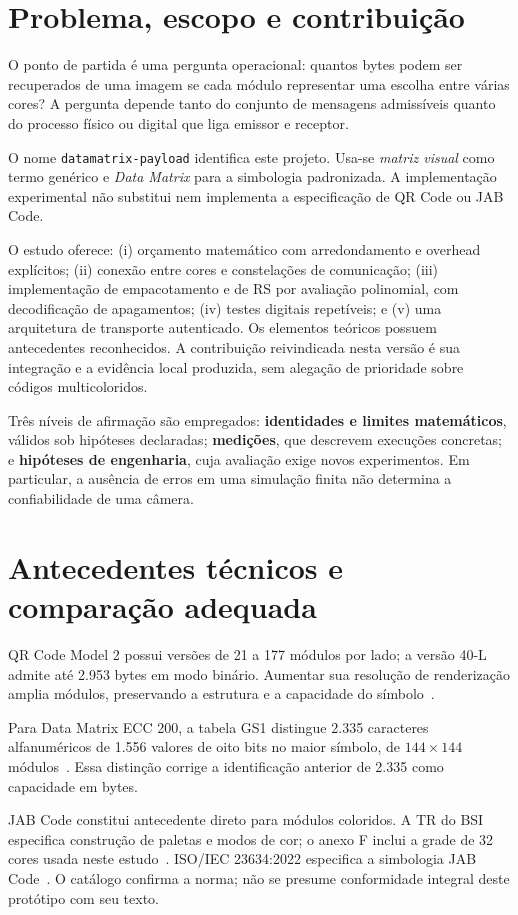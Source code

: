 \documentclass[11pt,a4paper]{article}
\begin{document}
\section{Problema, escopo e contribuição}
O ponto de partida é uma pergunta operacional: quantos bytes podem ser recuperados de uma imagem se cada módulo representar uma escolha entre várias cores? A pergunta depende tanto do conjunto de mensagens admissíveis quanto do processo físico ou digital que liga emissor e receptor.

O nome \texttt{datamatrix-payload} identifica este projeto. Usa-se \emph{matriz visual} como termo genérico e \emph{Data Matrix} para a simbologia padronizada. A implementação experimental não substitui nem implementa a especificação de QR Code ou JAB Code.

O estudo oferece: (i) orçamento matemático com arredondamento e overhead explícitos; (ii) conexão entre cores e constelações de comunicação; (iii) implementação de empacotamento e de RS por avaliação polinomial, com decodificação de apagamentos; (iv) testes digitais repetíveis; e (v) uma arquitetura de transporte autenticado. Os elementos teóricos possuem antecedentes reconhecidos. A contribuição reivindicada nesta versão é sua integração e a evidência local produzida, sem alegação de prioridade sobre códigos multicoloridos.

Três níveis de afirmação são empregados: \textbf{identidades e limites matemáticos}, válidos sob hipóteses declaradas; \textbf{medições}, que descrevem execuções concretas; e \textbf{hipóteses de engenharia}, cuja avaliação exige novos experimentos. Em particular, a ausência de erros em uma simulação finita não determina a confiabilidade de uma câmera.

\section{Antecedentes técnicos e comparação adequada}
QR Code Model 2 possui versões de 21 a 177 módulos por lado; a versão 40-L admite até 2.953 bytes em modo binário. Aumentar sua resolução de renderização amplia módulos, preservando a estrutura e a capacidade do símbolo~\cite{densoVersions}.

Para Data Matrix ECC 200, a tabela GS1 distingue 2.335 caracteres alfanuméricos de 1.556 valores de oito bits no maior símbolo, de $144\times144$ módulos~\cite{2024gs1General}. Essa distinção corrige a identificação anterior de 2.335 como capacidade em bytes.

JAB Code constitui antecedente direto para módulos coloridos. A TR do BSI especifica construção de paletas e modos de cor; o anexo F inclui a grade de 32 cores usada neste estudo~\cite{2020bsiJab}. ISO/IEC 23634:2022 especifica a simbologia JAB Code~\cite{2022isoJab}. O catálogo confirma a norma; não se presume conformidade integral deste protótipo com seu texto.
\end{document}
